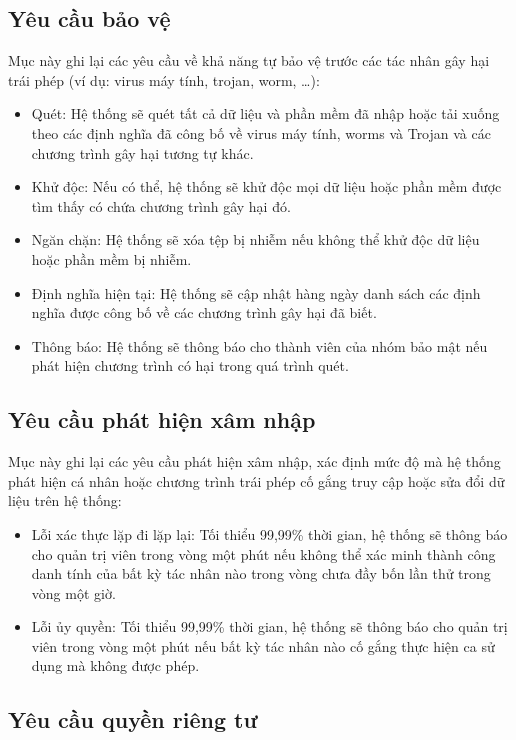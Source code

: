 \documentclass[./../main_file.tex]{subfiles}
\begin{document}
	\subsection{Yêu cầu bảo vệ}
	Mục này ghi lại các yêu cầu về khả năng tự bảo vệ trước các tác nhân gây hại trái phép (ví dụ: virus máy tính, trojan, worm, …):
	\begin{itemize}
		\item Quét: Hệ thống sẽ quét tất cả dữ liệu và phần mềm đã nhập hoặc tải xuống theo các định nghĩa đã công bố về virus máy tính, worms và Trojan và các chương trình gây hại tương tự khác.
		\item Khử độc: Nếu có thể, hệ thống sẽ khử độc mọi dữ liệu hoặc phần mềm được tìm thấy có chứa chương trình gây hại đó.
		\item Ngăn chặn: Hệ thống sẽ xóa tệp bị nhiễm nếu không thể khử độc dữ liệu hoặc phần mềm bị nhiễm.
		\item Định nghĩa hiện tại: Hệ thống sẽ cập nhật hàng ngày danh sách các định nghĩa được công bố về các chương trình gây hại đã biết.
		\item Thông báo: Hệ thống sẽ thông báo cho thành viên của nhóm bảo mật nếu phát hiện chương trình có hại trong quá trình quét.
		
	\end{itemize}
	
	\subsection{Yêu cầu phát hiện xâm nhập}
	Mục này ghi lại các yêu cầu phát hiện xâm nhập, xác định mức độ mà hệ thống phát hiện cá nhân hoặc chương trình trái phép cố gắng truy cập hoặc sửa đổi dữ liệu trên hệ thống:
	\begin{itemize}
		\item Lỗi xác thực lặp đi lặp lại: Tối thiểu 99,99\% thời gian, hệ thống sẽ thông báo cho quản trị viên trong vòng một phút nếu không thể xác minh thành công danh tính của bất kỳ tác nhân nào trong vòng chưa đầy bốn lần thử trong vòng một giờ.
		\item Lỗi ủy quyền: Tối thiểu 99,99\% thời gian, hệ thống sẽ thông báo cho quản trị viên trong vòng một phút nếu bất kỳ tác nhân nào cố gắng thực hiện ca sử dụng mà không được phép.
		
	\end{itemize}
	
	\subsection{Yêu cầu quyền riêng tư}
	
\end{document}
